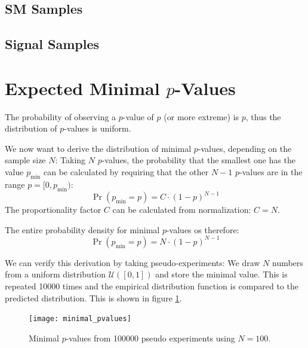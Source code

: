 \pagebreak
{
    \begin{landscape}    
        \subsection{\acl{SM} Samples}
        {
            \scriptsize
            \def\arraystretch{1}
            \centering
            
        }
        \newpage
        \subsection{Signal Samples}     
        {
            \scriptsize
            \def\arraystretch{1}
            \centering
            
        }
    \end{landscape}
}

\newpage
\section{Expected Minimal $p$-Values}
\label{app:minimal_pvalues}

The probability of observing a $p$-value of $p$ (or more extreme) is $p$, thus the distribution of $p$-values is uniform.

We now want to derive the distribution of minimal $p$-values, depending on the sample size $N$: 
Taking $N$ $p$-values, the probability that the smallest one has the value $p_\text{min}$ can be calculated by requiring that the other $N-1$ $p$-values are in the range $p=[0, p_\text{min})$:
\begin{equation}
    \Pr(p_\text{min} = p) = C \cdot \left(1-p\right)^{N-1}
\end{equation}
The proportionality factor $C$ can be calculated from normalization: $C = N$.

The entire probability density for minimal $p$-values os therefore:
\begin{equation}
    \Pr(p_\text{min} = p) = N \cdot \left(1-p\right)^{N-1}
\end{equation}

We can verify this derivation by taking pseudo-experiments: We draw $N$ numbers from a uniform distribution $\mathcal{U}([0, 1])$ and store the minimal value. This is repeated \num{10000} times and the empirical distribution function is compared to the predicted distribution. This is shown in figure \ref{fig:minimal_pvalues}.
\begin{figure}
    \centering
    \texttt{[image: minimal\_pvalues]}
    \caption{Minimal $p$-values from \num{100000} pseudo experiments using $N = \num{100}$.}
    \label{fig:minimal_pvalues}
\end{figure}

